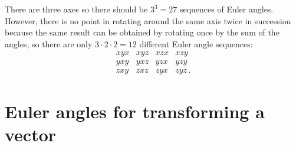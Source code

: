 \documentclass[11pt,a4paper]{report}
\begin{document}
There are three axes so there should be $3^3=27$ sequences of Euler angles. However, there is no point in rotating around the same axis twice in succession because the same result can be obtained by rotating once by the sum of the angles, so there are only $3\cdot 2\cdot 2=12$ different Euler angle sequences:
\[
\begin{array}{cccc}
xyx & xyz & xzx & xzy \\
yxy & yxz & yzx & yzy \\
zxy & zxz & zyx & zyz\,.
\end{array}
\]

\section{Euler angles for transforming a vector}
\end{document}
